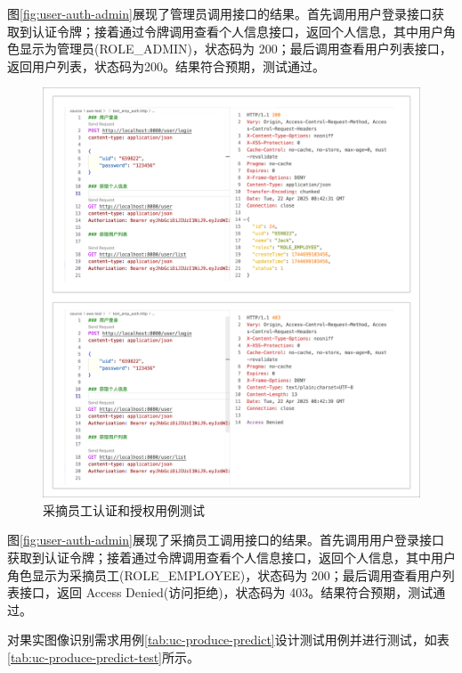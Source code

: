 图\ref{fig:user-auth-admin}展现了管理员调用接口的结果。首先调用用户登录接口获取到认证令牌；接着通过令牌调用查看个人信息接口，返回个人信息，其中用户角色显示为管理员(ROLE\_ADMIN)，状态码为 200；最后调用查看用户列表接口，返回用户列表，状态码为200。结果符合预期，测试通过。

\begin{figure}[H]
    \centering
    \includegraphics[width=0.9\linewidth]{../result/user-auth-emp.png}
    \caption{采摘员工认证和授权用例测试}
    \label{fig:user-auth-emp}
\end{figure}

图\ref{fig:user-auth-admin}展现了采摘员工调用接口的结果。首先调用用户登录接口获取到认证令牌；接着通过令牌调用查看个人信息接口，返回个人信息，其中用户角色显示为采摘员工(ROLE\_EMPLOYEE)，状态码为 200；最后调用查看用户列表接口，返回 Access Denied(访问拒绝)，状态码为 403。结果符合预期，测试通过。

\newpage
对果实图像识别需求用例\ref{tab:uc-produce-predict}设计测试用例并进行测试，如表\ref{tab:uc-produce-predict-test}所示。

